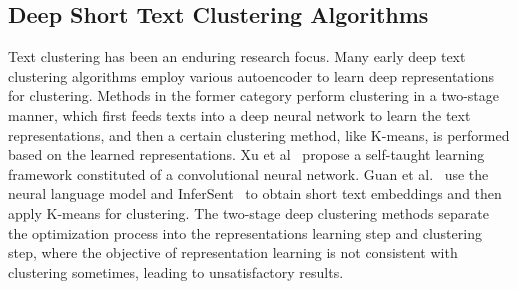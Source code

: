 

\subsection{Deep Short Text Clustering Algorithms}
Text clustering has been an enduring research focus. Many early deep text clustering algorithms employ various autoencoder to learn deep representations for clustering. Methods in the former category perform clustering in a two-stage manner, which first feeds texts into a deep neural network to learn the text representations, and then a certain clustering method, like K-means, is performed based on the learned representations. Xu et al~\cite{stcc} propose a self-taught learning framework constituted of a convolutional neural network. Guan et al.~\cite{guan2020deep} use the neural language model and InferSent~\cite{conneau2017supervised} to obtain short text embeddings and then apply K-means for clustering. The two-stage deep clustering methods separate the optimization process into the representations learning step and clustering step, where the objective of representation learning is not consistent with clustering sometimes, leading to unsatisfactory results.


